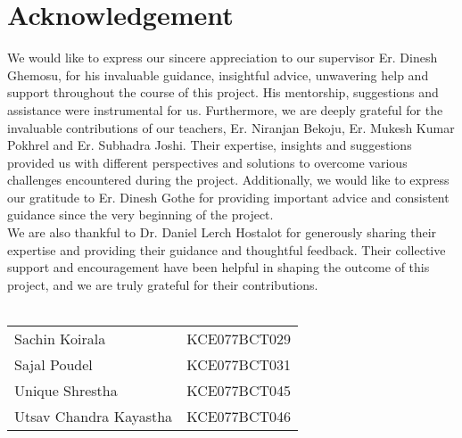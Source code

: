 \chapter*{Acknowledgement}

We would like to express our sincere appreciation to our supervisor Er. Dinesh Ghemosu, for his invaluable guidance, insightful advice, unwavering help and support throughout the course of this project. His mentorship, suggestions and assistance were instrumental for us. Furthermore, we are deeply grateful for the invaluable contributions of our teachers, Er. Niranjan Bekoju, Er. Mukesh Kumar Pokhrel and Er. Subhadra Joshi. Their expertise, insights and suggestions provided us with different perspectives and solutions to overcome various challenges encountered during the project. Additionally, we would like to express our gratitude to Er. Dinesh Gothe for providing important advice and consistent guidance since the very beginning of the project. \\
We are also thankful to Dr. Daniel Lerch Hostalot for generously sharing their expertise and providing their guidance and thoughtful feedback. Their collective support and encouragement have been helpful in shaping the outcome of this project, and we are truly grateful for their contributions.
\\ \\
\begin{flushleft}
\begin{tabular}{l l}
Sachin Koirala& KCE077BCT029\\
Sajal Poudel&   KCE077BCT031\\
Unique Shrestha&    KCE077BCT045\\
Utsav Chandra Kayastha& KCE077BCT046\\
\end{tabular}
\end{flushleft}

